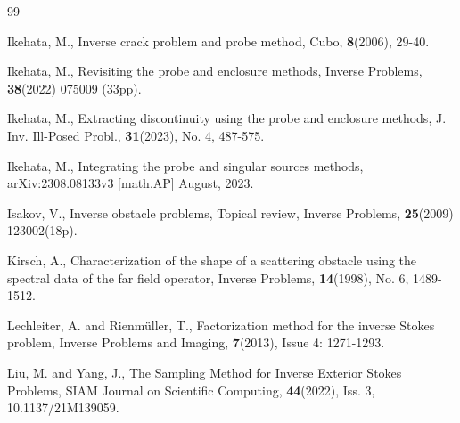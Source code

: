 \begin{thebibliography}{99}
             

  Ikehata, M.,
             Inverse crack problem and probe method,
             Cubo, {\bf 8}(2006), 29-40.








  Ikehata, M.,
            Revisiting the probe and enclosure methods,
            Inverse Problems, {\bf 38}(2022) 075009 (33pp).



  Ikehata, M.,
             Extracting  discontinuity using the probe and enclosure methods,
             J. Inv. Ill-Posed Probl., {\bf 31}(2023), No. 4, 487-575.



  Ikehata, M., Integrating the probe and singular sources methods,  arXiv:2308.08133v3 [math.AP]
              August, 2023.




              

              
















 Isakov, V., Inverse obstacle problems, Topical review, Inverse Problems, {\bf 25}(2009) 123002(18p).





 Kirsch, A.,
           \newblock Characterization of the shape of a scattering obstacle using the spectral data of 
           the far field operator,
           \newblock Inverse Problems, {\bf 14}(1998), No. 6, 1489-1512.







  Lechleiter, A. and Rienm\"{u}ller, T.,
               Factorization method for the inverse Stokes problem,
               Inverse Problems and Imaging, {\bf 7}(2013), Issue 4: 1271-1293.
               

  Liu, M. and Yang, J.,
                The Sampling Method for Inverse Exterior Stokes Problems,
                SIAM Journal on Scientific Computing, {\bf 44}(2022), Iss. 3, 10.1137/21M139059.


\end{thebibliography}

